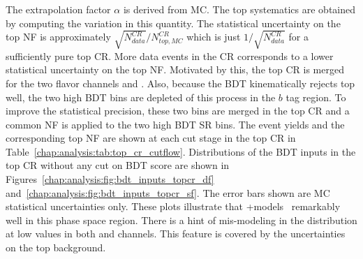 \noindent The extrapolation factor $\alpha$ is derived from
MC. The top systematics are obtained by computing the variation in
this quantity. The statistical uncertainty on the top NF is
approximately $\sqrt{N_{data}^{CR}}/N_{top,MC}^{CR}$ which is just
$1/\sqrt{N_{data}^{CR}}$ for a sufficiently pure top CR. More data
events in the CR corresponds to a lower statistical uncertainty on the
top NF. Motivated by this, the top CR is merged for the two flavor
channels \eemm and \emme. Also, because the BDT kinematically rejects
top well, the two high BDT bins are depleted of this process in
the $b$ tag region. To improve the statistical precision, these two
bins are merged in the top CR and a common NF is applied to the two
high BDT SR bins. The event yields and the corresponding top NF are
shown at each cut stage in the top CR in
Table~\ref{chap:analysis:tab:top_cr_cutflow}. Distributions of the BDT
inputs in the top CR without any cut on BDT score are shown in
Figures~\ref{chap:analysis:fig:bdt_inputs_topcr_df}
and~\ref{chap:analysis:fig:bdt_inputs_topcr_sf}. The error bars shown
are MC statistical uncertainties only. These plots illustrate
that \POWHEG+\PYTHIA models \ttbar~remarkably well in this phase space
region. There is a hint of mis-modeling in the \dphill distribution at
low values in both \emme and \eemm channels. This feature is covered
by the uncertainties on the top background. 

